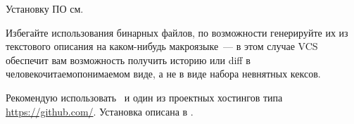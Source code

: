 
\label{git}\cite{progit}

Установку ПО см.

  Избегайте использования бинарных файлов, по возможности генерируйте их из
  текстового описания на каком-нибудь макроязыке\ --- в этом случае VCS
  обеспечит вам возможность получить историю или diff в
  человекочитаемопонимаемом виде, а не в виде набора невнятных кексов.
  
  Рекомендую использовать \git\ и один из проектных хостингов типа
  \url{https://github.com/}. Установка описана в .
  
